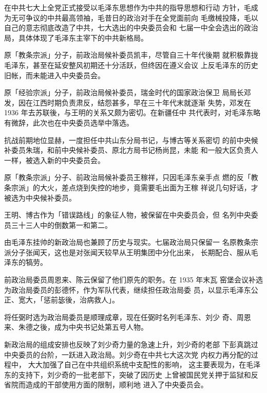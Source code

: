 在中共七大上全党正式接受以毛泽东思想作为中共的指导思想和行动
方针，毛成为无可争议的中共最高领袖，毛昔日的政治对手在全党面前向
毛缴械投降，毛以自己的意志彻底改造了中共，七大选出的中央委员会和
七届一中全会选出的政治局，具体体现了毛泽东主宰下的中共新格局。

原「教条宗派」分子，前政治局候补委员凯丰，尽管自三十年代後期
就积极靠拢毛泽东，甚至在延安整风初期还十分活跃，但终因在遵义会议
上反毛泽东的历史旧帐，而未能进入中央委员会。

原「经验宗派」分子，前政治局候补委员，瑞金时代的国家政治保卫
局局长邓发，因在江西时期负责肃反，结怨甚多，早在三十年代末就逐渐
失势，邓发在 1936 年去苏联後，与王明的关系又颇为密切。在新疆任中
共代表时，对毛泽东略有微辞，此次也在中央委员选举中落选。

抗战前期地位显赫，一度担任中共山东分局书记，与博古等关系密切
的前中央候补委员朱瑞，和前中央候补委员、原北方局书记杨尚昆，未能
和一般大区负责人一样，被选入新的中央委员会。

原「教条宗派」分子、前政治局候补委员王稼祥，只因毛泽东亲手点
燃的反「教条宗派」的大火，差点烧到失控的地步，竟需要毛出面为王稼
祥说几句好话，才被选为中央候补委员。

王明、博古作为「错误路线」的象征人物，被保留在中央委员会，但
名列中央委员三十三人中的倒数第一和第二。

由毛泽东挂帅的新政治局也兼顾了历史与现实。七届政治局只保留一
名原教条宗派分子张闻天，这也是对张闻天较早从王明集团中分化出来，
长期配合、服从毛泽东的犒劳。

前政治局委员周恩来、陈云保留了他们原先的职务。在 1935 年末瓦
窑堡会议补选为政治局委员的彭德怀，作为军队代表，继续担任政治局委
员，以显示毛泽东公正、宽大，「惩前毖後，治病救人」。

将任弼时选为政治局委员是顺理成章，现在任弼时名列毛泽东、刘少
奇、周恩来、朱德之後，成为中央书记处第五号人物。

新政治局的组成安排也反映了刘少奇力量的急速上升，刘少奇的老部
下彭真跳过中央委员的台阶，一跃进入政治局。刘少奇在中共七大这次党
内权力再分配的过程中，
大大加强了自己在中共组织系统中支配性的影响，
这主要表现为，在毛泽东的支持下，刘少奇的一批老部下，突破了因历史
上曾被国民党关押于监狱和反省院而造成的干部使用方面的限制，顺利地
进入了中央委员会。

